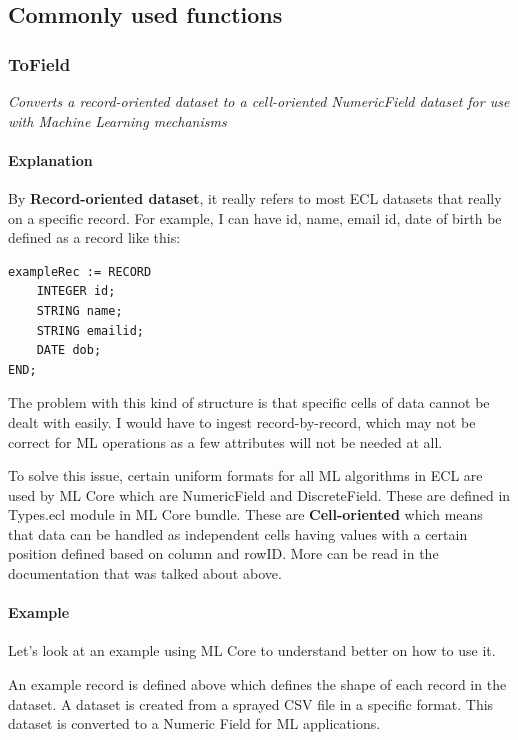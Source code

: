 \subsection{Commonly used functions}

\subsubsection{ToField}\label{mlcore:tofield}

\textit{Converts a record-oriented dataset to a cell-oriented NumericField dataset for use with Machine Learning mechanisms}

\paragraph{Explanation}

By \textbf{Record-oriented dataset}, it really refers to most ECL datasets that really on a specific record. For example, I can have id, name, email id, date of birth be defined as a record like this:

\begin{lstlisting}
exampleRec := RECORD
    INTEGER id;
    STRING name;
    STRING emailid;
    DATE dob;
END;
\end{lstlisting}

The problem with this kind of structure is that specific cells of data cannot be dealt with easily. I would have to ingest record-by-record, which may not be correct for ML operations as a few attributes will not be needed at all.

To solve this issue, certain uniform formats for all ML algorithms in ECL are used by ML Core which are NumericField and DiscreteField. These are defined in Types.ecl module in ML Core bundle. These are \textbf{Cell-oriented} which means that data can be handled as independent cells having values with a certain position defined based on column and rowID. More can be read in the documentation that was talked about above.

\paragraph{Example}

Let's look at an example using ML Core to understand better on how to use it.



An example record is defined above which defines the shape of each record in the dataset. A dataset is created from a sprayed CSV file in a specific format. This dataset is converted to a Numeric Field for ML applications.

